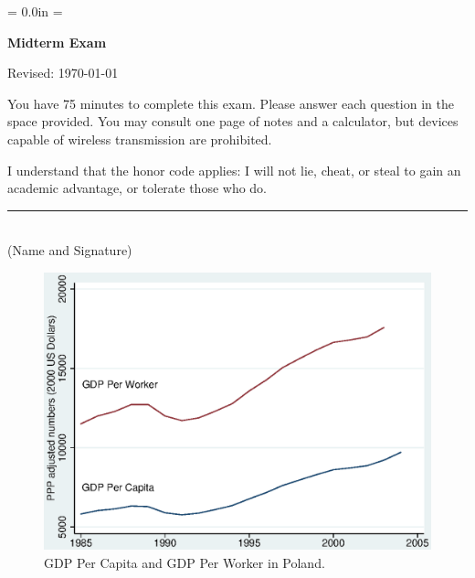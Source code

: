 \documentclass[letterpaper,12pt]{article}
\def\HeadName{Midterm Exam}
\begin{document}
\parindent = 0.0in
\parskip = \bigskipamount
\thispagestyle{empty}%
\Head

\centerline{\large \bf \HeadName}%
\centerline{Revised:  \today}

\bigskip
You have 75 minutes to complete this exam.  Please answer each
question in the space provided. You may consult one page of notes
and a calculator, but devices capable of wireless transmission are
prohibited.

I understand that the honor code applies: I will not lie, cheat,
or steal to gain an academic advantage, or tolerate those who do.

\begin{flushright}
\rule{4in}{0.5pt} \\ (Name and Signature)
\end{flushright}

\begin{figure}[h]
    \centering
    \includegraphics[scale=0.8]{pwtpolypopyl.eps}
    \caption{GDP Per Capita and GDP Per Worker in Poland.}
    \label{fig:mexico}
\end{figure}
\end{document}
